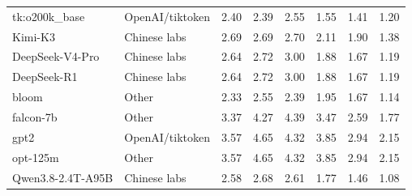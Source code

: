 \begin{tabular}{llrrrrrr}
tk:o200k\_base & OpenAI/tiktoken & 2.40 & 2.39 & 2.55 & 1.55 & 1.41 & 1.20 \\
Kimi-K3 & Chinese labs & 2.69 & 2.69 & 2.70 & 2.11 & 1.90 & 1.38 \\
DeepSeek-V4-Pro & Chinese labs & 2.64 & 2.72 & 3.00 & 1.88 & 1.67 & 1.19 \\
DeepSeek-R1 & Chinese labs & 2.64 & 2.72 & 3.00 & 1.88 & 1.67 & 1.19 \\
bloom & Other & 2.33 & 2.55 & 2.39 & 1.95 & 1.67 & 1.14 \\
falcon-7b & Other & 3.37 & 4.27 & 4.39 & 3.47 & 2.59 & 1.77 \\
gpt2 & OpenAI/tiktoken & 3.57 & 4.65 & 4.32 & 3.85 & 2.94 & 2.15 \\
opt-125m & Other & 3.57 & 4.65 & 4.32 & 3.85 & 2.94 & 2.15 \\
Qwen3.8-2.4T-A95B & Chinese labs & 2.58 & 2.68 & 2.61 & 1.77 & 1.46 & 1.08 \\
\bottomrule
\end{tabular}